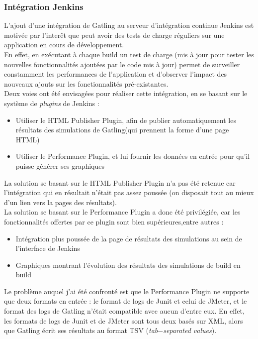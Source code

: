 \subsubsection{Intégration Jenkins}

L'ajout d'une intégration de Gatling au serveur d'intégration continue Jenkins est motivée par l'interêt que peut avoir des tests de charge réguliers sur une application en cours de développement.\\
En effet, en exécutant à chaque build un test de charge (mis à jour pour tester les nouvelles fonctionnalités ajoutées par le code mis à jour) permet de surveiller constamment les performances de l'application et d'observer l'impact des nouveaux ajouts sur les fonctionnalités pré-existantes.\\

Deux voies ont été envisagées pour réaliser cette intégration, en se basant sur le système de \textit{plugins} de Jenkins : 
\begin{itemize}
	\item Utiliser le HTML Publisher Plugin, afin de publier automatiquement les résultats des simulations de Gatling(qui prennent la forme d'une page HTML)
	\item Utiliser le Performance Plugin, et lui fournir les données en entrée pour qu'il puisse générer ses graphiques 
\end{itemize}

La solution se basant sur le HTML Publisher Plugin n'a pas été retenue car l'intégration qui en résultait n'était pas assez poussée (on disposait tout au mieux d'un lien vers la pages des résultats).\\

La solution se basant sur le Performance Plugin a donc été privilégiée, car les fonctionnalités offertes par ce plugin sont bien supérieures,entre autres : 
\begin{itemize}
	\item Intégration plus poussée de la page de résultats des simulations au sein de l'interface de Jenkins
	\item Graphiques montrant l'évolution des résultats des simulations de build en build\\
\end{itemize}

Le problème auquel j'ai été confronté est que le Performance Plugin ne supporte que deux formats en entrée : le format de logs de Junit et celui de JMeter, et le format des logs de Gatling n'était compatible avec aucun d'entre eux.
En effet, les formats de logs de Junit et de JMeter sont tous deux basés sur XML, alors que Gatling écrit ses résultats au format TSV (\textit{tab$-$separated values}).\\

